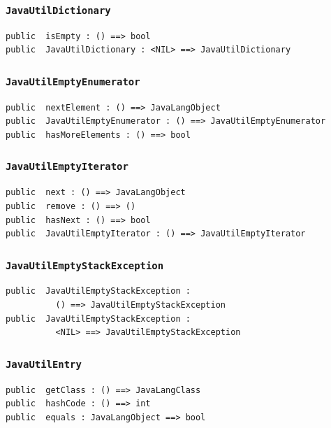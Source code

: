 \documentclass[\pformat,12pt]{article}
\begin{document}
\subsubsection{\texttt{JavaUtilDictionary}}
\begin{small}
\begin{verbatim}
public  isEmpty : () ==> bool
public  JavaUtilDictionary : <NIL> ==> JavaUtilDictionary
\end{verbatim}
\end{small}

\subsubsection{\texttt{JavaUtilEmptyEnumerator}}
\begin{small}
\begin{verbatim}
public  nextElement : () ==> JavaLangObject
public  JavaUtilEmptyEnumerator : () ==> JavaUtilEmptyEnumerator
public  hasMoreElements : () ==> bool
\end{verbatim}
\end{small}

\subsubsection{\texttt{JavaUtilEmptyIterator}}
\begin{small}
\begin{verbatim}
public  next : () ==> JavaLangObject
public  remove : () ==> ()
public  hasNext : () ==> bool
public  JavaUtilEmptyIterator : () ==> JavaUtilEmptyIterator
\end{verbatim}
\end{small}

\subsubsection{\texttt{JavaUtilEmptyStackException}}
\begin{small}
\begin{verbatim}
public  JavaUtilEmptyStackException : 
          () ==> JavaUtilEmptyStackException
public  JavaUtilEmptyStackException : 
          <NIL> ==> JavaUtilEmptyStackException
\end{verbatim}
\end{small}

\subsubsection{\texttt{JavaUtilEntry}}
\begin{small}
\begin{verbatim}
public  getClass : () ==> JavaLangClass
public  hashCode : () ==> int
public  equals : JavaLangObject ==> bool
\end{verbatim}
\end{small}
\end{document}
